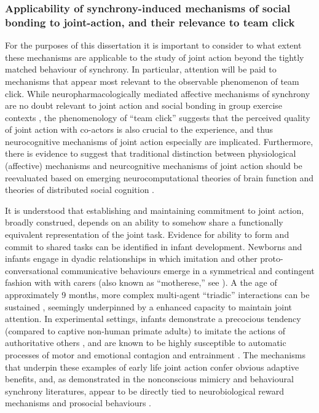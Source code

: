 \subsubsection{Applicability of synchrony-induced mechanisms of social bonding to joint-action, and their relevance to team click}
For the purposes of this dissertation it is important to consider to what extent these mechanisms are applicable to the study of joint action beyond the tightly matched behaviour of synchrony. In particular, attention will be paid to mechanisms that appear most relevant to the observable phenomenon of team click. While neuropharmacologically mediated affective mechanisms of synchrony are no doubt relevant to joint action and social bonding in group exercise contexts \citep[see]{Cohen2009,Sullivan2013,Tarr2015}, the phenomenology of ``team click'' suggests that the perceived quality of joint action with co-actors is also crucial to the experience, and thus neurocognitive mechanisms of joint action especially are implicated.
Furthermore, there is evidence to suggest that traditional distinction between physiological (affective) mechanisms and neurcognitive mechanisms of joint action should be reevaluated based on emerging neurocomputational theories of brain function and theories of distributed social cognition \citep{Pessoa2013,Pessoa2014,Miller2017}.


It is understood that establishing and maintaining commitment to joint action, broadly construed, depends on an ability to somehow share a functionally equivalent representation of the joint task\citep{Vesper2010,Michael2016}.  Evidence for ability to form and commit to shared tasks can be identified in infant development.  Newborns and infants engage in dyadic relationships in which imitation and other proto-conversational communicative behaviours emerge in a symmetrical and contingent fashion with with carers (also known as ``motherese,'' see \cite{Braten2007}). A the age of approximately 9 months, more complex multi-agent ``triadic'' interactions can be sustained \citep{Colle2008}, seemingly underpinned by a enhanced capacity to maintain joint attention.
In experimental settings, infants demonstrate a precocious tendency (compared to captive non-human primate adults) to imitate the actions of authoritative others \citep{Tomasello2014}, and are known to be highly susceptible to automatic processes of motor and emotional contagion and entrainment \citep{Bargh2012}. The mechanisms that underpin these examples of early life joint action confer obvious adaptive benefits, and, as demonstrated in the nonconscious mimicry and behavioural synchrony literatures, appear to be directly tied to neurobiological reward mechanisms and prosocial behaviours \citep{Hurley2008,Launay2016}.

